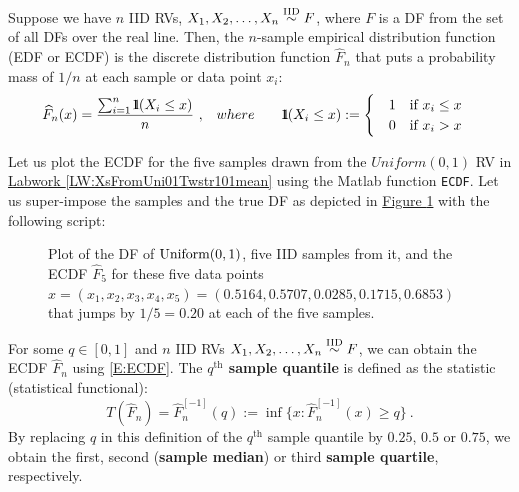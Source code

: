 \begin{definition}\label{D:ECDF}
Suppose we have $n$ IID RVs, $X_1,X_2,\ldots,X_n \overset{{\rm IID}}{\sim} F$, where $F$ is a DF from the set of all DFs over the real line.  Then, the $n$-sample empirical distribution function (EDF or ECDF) is the discrete  distribution function $\widehat{F}_n$ that puts a probability mass of $1/n$ at each sample or data point $x_i$:
\begin{eqnarray} \label{E:ECDF}
\widehat{F}_n(x) = \frac{ \sum_{i=1}^n \BB{1}(X_i \leq x) }{n} \ ,  & \quad where \qquad
\BB{1}(X_i \leq x) :=
\begin{cases}
& 1  \quad \text{if $x_i \leq x$} \\
& 0  \quad \text{if $x_i > x$} 
\end{cases}
\end{eqnarray}
\end{definition}

\begin{labwork}\label{LW:ECDF}
Let us plot the ECDF for the five samples drawn from the $Uniform(0,1)$ RV in \hyperref[LW:XsFromUni01Twstr101mean]{Labwork \ref*{LW:XsFromUni01Twstr101mean}} using the {\sc Matlab} function {\tt ECDF}. %
Let us super-impose the samples and the true DF as depicted in \hyperref[F:plotUniform01ECDF5]{Figure \ref*{F:plotUniform01ECDF5}} with the following script:
{}

\begin{figure}[htpb]
\caption{Plot of the DF of $\mbox{{\rm Uniform}}(0,1)$, five IID samples from it, and the ECDF $\widehat{F}_5$ for these five data points $x=(x_1,x_2,x_3,x_4,x_5)=(0.5164,    0.5707,    0.0285,    0.1715,    0.6853)$ that jumps by $1/5=0.20$ at each of the five samples.\label{F:plotUniform01ECDF5}}
\centering   {}
\end{figure}
\end{labwork}

\begin{definition}
For some $q \in [0,1]$ and $n$ IID RVs $X_1,X_2,\ldots,X_n \overset{{\rm IID}}{\sim} F$, we can obtain the ECDF $\widehat{F}_n$ using \eqref{E:ECDF}.  The {\bf $q^{\text{th}}$ sample quantile} is defined as the statistic (statistical functional):
\begin{equation}\label{E:qthSampleQuantile}
T(\widehat{F}_n) = \widehat{F}_n^{[-1]}(q) := \inf{ \{ x:  \widehat{F}_n^{[-1]}(x) \geq q \} } \ .
\end{equation}
By replacing $q$ in this definition of the $q^{\text{th}}$ sample quantile by $0.25$, $0.5$ or $0.75$, we obtain the first, second ({\bf sample median}) or third {\bf sample quartile}, respectively.
\end{definition}

